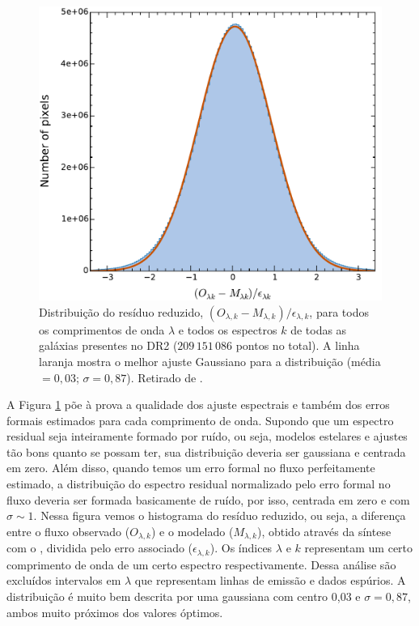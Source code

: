 \begin{figure}
	\centering
	\includegraphics[scale=0.7]{figuras/DR2_hist_error.pdf}
	\caption[DR2: Distribuição dos resíduos reduzidos]
	{Distribuição do resíduo reduzido, $(O_{\lambda,k} - M_{\lambda,k})/\epsilon_{\lambda,k}$, para todos os comprimentos de onda $\lambda$ e todos os espectros $k$ de todas as galáxias presentes no DR2 ($209\,151\,086$ pontos no total). A linha laranja mostra o melhor ajuste Gaussiano para a distribuição (média $= 0,03$; $\sigma = 0,87$). Retirado de \citet{GarciaBenito.etal.2015a}.}
	\label{fig:fres_norm_error_distrib}
\end{figure}

A Figura \ref{fig:fres_norm_error_distrib} põe à prova a qualidade dos ajuste espectrais e também dos erros formais estimados para cada comprimento de onda. Supondo que um espectro residual seja inteiramente formado por ruído, ou seja, modelos estelares e ajustes tão bons quanto se possam ter, sua distribuição deveria ser gaussiana e centrada em zero. Além disso, quando temos um erro formal no fluxo perfeitamente estimado, a distribuição do espectro residual normalizado pelo erro formal no fluxo deveria ser formada basicamente de ruído, por isso, centrada em zero e com $\sigma \sim 1$. Nessa figura vemos o histograma do resíduo reduzido, ou seja, a diferença entre o fluxo observado ($O_{\lambda,k}$) e o modelado ($M_{\lambda,k}$), obtido através da síntese com o \starlight, dividida pelo erro associado ($\epsilon_{\lambda,k}$). Os índices $\lambda$ e $k$ representam um certo comprimento de onda de um certo espectro respectivamente. Dessa análise são excluídos intervalos em $\lambda$ que representam linhas de emissão e dados espúrios. A distribuição é muito bem descrita por uma gaussiana com centro 0,03 e $\sigma = 0,87$, ambos muito próximos dos valores óptimos.

